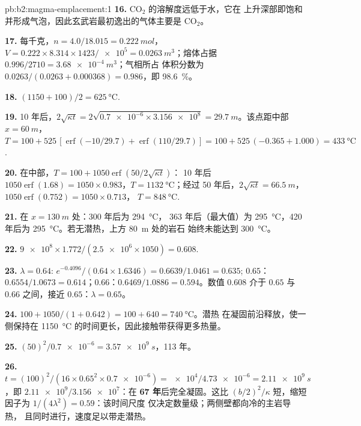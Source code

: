 \begin{solution}{pb:b2:magma-emplacement:1}
\textbf{16.} CO$_2$ 的溶解度远低于水，它在
上升深部即饱和并形成气泡，因此玄武岩最初逸出的气体主要是 CO$_2$。

\textbf{17.} 每千克，$n = 4.0/18.015 = \qty{0.222}{mol}$，$V = 0.222\times8.314\times1423/
\num{e5} = \qty{0.0263}{m^3}$；熔体占据 $0.996/2710 = \qty{3.68e-4}{m^3}$；气相所占
体积分数为 $0.0263/(0.0263 + 0.000368) = 0.986$，即 \qty{98.6}{\percent}。

\textbf{18.} $(1150 + 100)/2 = \qty{625}{\celsius}$.

\textbf{19.} 10 年后，$2\sqrt{\kappa t} = 2\sqrt{\num{0.7e-6}\times\num{3.156e8}} =
\qty{29.7}{m}$。该点距中部 $x = \qty{60}{m}$，$T = 100 +
525\,[\operatorname{erf}(-10/29.7) + \operatorname{erf}(110/29.7)] = 100 + 525\,(-0.365 +
1.000) = \qty{433}{\celsius}$.

\textbf{20.} 在中部，$T = 100 + 1050\operatorname{erf}(50/2\sqrt{\kappa t})$：
10 年后 $1050\operatorname{erf}(1.68) = 1050\times0.983$，$T = \qty{1132}{\celsius}$；经过
50 年后，$2\sqrt{\kappa t} = \qty{66.5}{m}$，$1050\operatorname{erf}(0.752) = 1050\times0.713$，
$T = \qty{848}{\celsius}$.

\textbf{21.} 在 $x = \qty{130}{m}$ 处：300 年后为 \qty{294}{\celsius}，
363 年后（最大值）为 \qty{295}{\celsius}，420
年后为 \qty{295}{\celsius}。若无潜热，上方 \qty{80}{m} 处的岩石
始终未能达到 \qty{300}{\celsius}。

\textbf{22.} $\num{9e8}\times1.772/(\num{2.5e6}\times1050) = 0.608$.

\textbf{23.} $\lambda = 0.64$: $e^{-0.4096}/(0.64\times1.6346) = 0.6639/1.0461 = 0.635$;
$0.65$：$0.6554/1.0673 = 0.614$；$0.66$：$0.6469/1.0886 = 0.594$。数值 $0.608$
介于 $0.65$ 与 $0.66$ 之间，接近 $0.65$：$\lambda = 0.65$。

\textbf{24.} $100 + 1050/(1 + 0.642) = 100 + 640 = \qty{740}{\celsius}$。潜热
在凝固前沿释放，使一侧保持在
\qty{1150}{\celsius} 的时间更长，因此接触带获得更多热量。

\textbf{25.} $(50)^2/\num{0.7e-6} = \qty{3.57e9}{s}$，113 年。

\textbf{26.} $t = (100)^2/(16\times0.65^2\times\num{0.7e-6}) = \num{e4}/\num{4.73e-6} =
\qty{2.11e9}{s}$，即 $\num{2.11e9}/\num{3.156e7}$：在
\textbf{\qty[text-series-to-math=true]{67}{} 年}后完全凝固。这比
$(b/2)^2/\kappa$ 短，缩短因子为 $1/(4\lambda^2) = 0.59$：该时间尺度
仅决定数量级；两侧壁都向冷的主岩导热，
且同时进行，速度足以带走潜热。
\end{solution}
